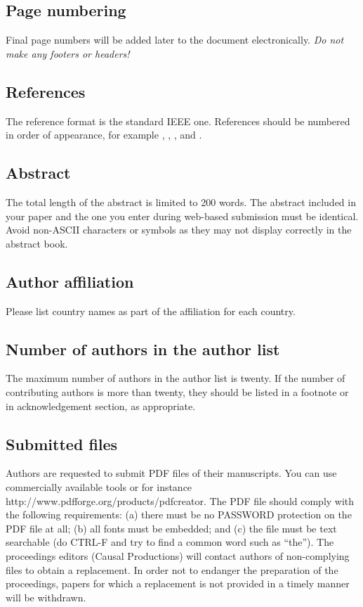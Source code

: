 \documentclass[a4paper]{article}
\begin{document}
\subsection{Page numbering}

Final page numbers will be added later to the document electronically. \emph{Do not make any footers or headers!}


\subsection{References}

The reference format is the standard IEEE one. References should be numbered in order of appearance, for example \cite{Davis80-COP}, \cite{Rabiner89-ATO}, \cite[pp.\ 417--422]{Hastie09-TEO}, and \cite{YourName21-XXX}.

\subsection{Abstract}

The total length of the abstract is limited to 200 words. The abstract included in your paper and the one you enter during web-based submission must be identical. Avoid non-ASCII characters or symbols as they may not display correctly in the abstract book.

\subsection{Author affiliation}

Please list country names as part of the affiliation for each country.

\subsection{Number of authors in the author list}

The maximum number of authors in the author list is twenty. If the number of contributing authors is more than twenty, they should be listed in a footnote or in acknowledgement section, as appropriate.

\subsection{Submitted files}

Authors are requested to submit PDF files of their manuscripts. You can use commercially available tools or for instance http://www.pdfforge.org/products/pdfcreator. The PDF file should comply with the following requirements: (a) there must be no PASSWORD protection on the PDF file at all; (b) all fonts must be embedded; and (c) the file must be text searchable (do CTRL-F and try to find a common word such as ``the''). The proceedings editors (Causal Productions) will contact authors of non-complying files to obtain a replacement. In order not to endanger the preparation of the proceedings, papers for which a replacement is not provided in a timely manner will be withdrawn.
\end{document}
